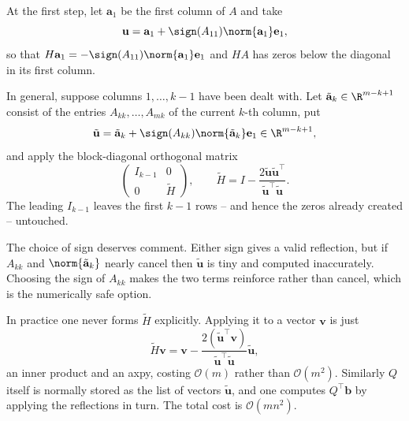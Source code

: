 \begin{method}[Householder QR]
  At the first step, let $\mathbf a_1$ be the first column of $A$ and take
  $$
  \mathbf u = \mathbf a_1 + \sign(A_{11})\norm{\mathbf a_1}\mathbf e_1,
  $$
  so that $H\mathbf a_1 = -\sign(A_{11})\norm{\mathbf a_1}\mathbf e_1$ and $HA$ has zeros below the diagonal in its first column.

  In general, suppose columns $1, \dots, k-1$ have been dealt with. Let $\tilde{\mathbf a}_k \in \R^{m-k+1}$ consist of the entries $A_{kk}, \dots, A_{mk}$ of the current $k$-th column, put
  $$
  \tilde{\mathbf u} = \tilde{\mathbf a}_k + \sign(A_{kk})\norm{\tilde{\mathbf a}_k}\mathbf e_1 \in \R^{m-k+1},
  $$
  and apply the block-diagonal orthogonal matrix
  $$
  \begin{pmatrix} I_{k-1} & 0\\ 0 & \tilde H\end{pmatrix}, \qquad \tilde H = I - \frac{2\tilde{\mathbf u}\tilde{\mathbf u}^\top}{\tilde{\mathbf u}^\top\tilde{\mathbf u}}.
  $$
  The leading $I_{k-1}$ leaves the first $k-1$ rows -- and hence the zeros already created -- untouched.
\end{method}

The choice of sign deserves comment. Either sign gives a valid reflection, but if $A_{kk}$ and $\norm{\tilde{\mathbf a}_k}$ nearly cancel then $\tilde{\mathbf u}$ is tiny and computed inaccurately. Choosing the sign of $A_{kk}$ makes the two terms reinforce rather than cancel, which is the numerically safe option.

In practice one never forms $\tilde H$ explicitly. Applying it to a vector $\mathbf v$ is just
$$
\tilde H\mathbf v = \mathbf v - \frac{2(\tilde{\mathbf u}^\top\mathbf v)}{\tilde{\mathbf u}^\top\tilde{\mathbf u}}\tilde{\mathbf u},
$$
an inner product and an axpy, costing $\mathcal{O}(m)$ rather than $\mathcal{O}(m^2)$. Similarly $Q$ itself is normally stored as the list of vectors $\tilde{\mathbf u}$, and one computes $Q^\top\mathbf b$ by applying the reflections in turn. The total cost is $\mathcal{O}(mn^2)$.

